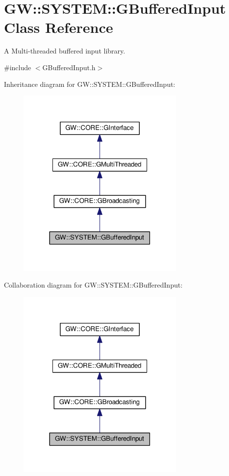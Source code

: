 \hypertarget{classGW_1_1SYSTEM_1_1GBufferedInput}{}\section{GW\+:\+:S\+Y\+S\+T\+EM\+:\+:G\+Buffered\+Input Class Reference}
\label{classGW_1_1SYSTEM_1_1GBufferedInput}


A Multi-\/threaded buffered input library.  




{\ttfamily \#include $<$G\+Buffered\+Input.\+h$>$}



Inheritance diagram for GW\+:\+:S\+Y\+S\+T\+EM\+:\+:G\+Buffered\+Input\+:
\nopagebreak
\begin{figure}[H]
\begin{center}
\leavevmode
\includegraphics[width=233pt]{classGW_1_1SYSTEM_1_1GBufferedInput__inherit__graph}
\end{center}
\end{figure}


Collaboration diagram for GW\+:\+:S\+Y\+S\+T\+EM\+:\+:G\+Buffered\+Input\+:
\nopagebreak
\begin{figure}[H]
\begin{center}
\leavevmode
\includegraphics[width=233pt]{classGW_1_1SYSTEM_1_1GBufferedInput__coll__graph}
\end{center}
\end{figure}
